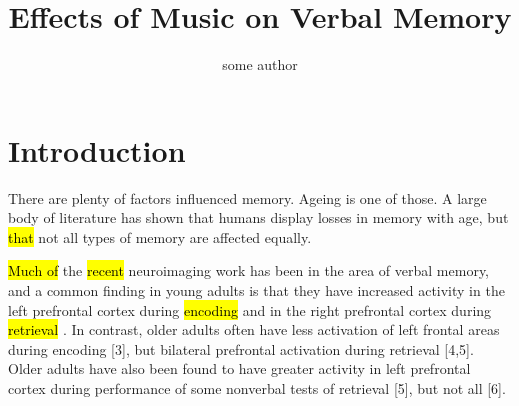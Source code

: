 \documentclass{article}
\title{Effects of Music on Verbal Memory}
\author{some author}
\begin{document}
\maketitle{}

\section{Introduction}

There are plenty of factors influenced memory. Ageing is one of those. A large body of literature has shown that humans display losses in memory with age, but \hl{that} not all types of memory are affected equally. 

\hl{Much of}  the \hl{recent}  neuroimaging work has been in the area of verbal memory, and a common finding in young adults is that they have increased activity in the left prefrontal cortex during \hl{encoding}  and in the right prefrontal cortex during \hl{retrieval}  \autocite{cabezaImagingCognitionEmpirical1997,gradyc.l.NeuroimagingActivationFrontal1999}. In contrast, older adults often have less activation of left frontal areas during encoding [3], but bilateral prefrontal activation during retrieval [4,5]. Older adults have also been found to have greater activity in left prefrontal cortex during performance of some nonverbal tests of retrieval [5], but not all [6].
\end{document}
